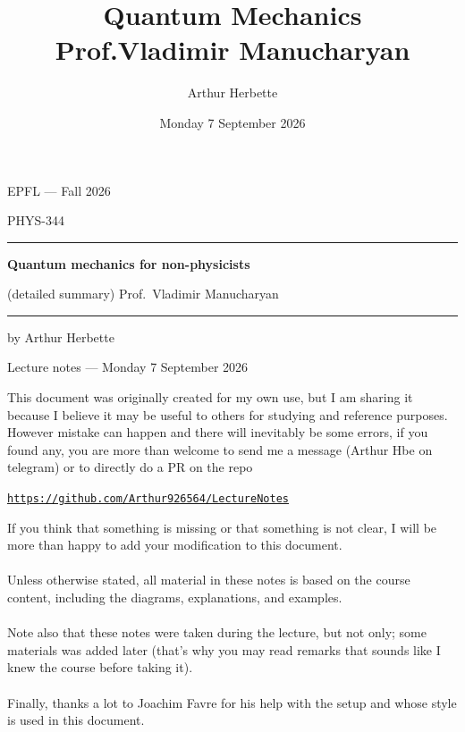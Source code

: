 \documentclass[a4paper]{book}
\title{Quantum Mechanics \\ Prof.Vladimir Manucharyan}
\author{Arthur Herbette}
\date{Monday 7 September 2026}
\begin{document}
\begin{titlepage}
    \centering
    \vspace*{2cm}
    
    {\large EPFL --- Fall 2026\par}
    \vspace{0.5cm}
    {\small PHYS-344\par}
    
    \vspace{2cm}
    \rule{\linewidth}{0.4pt}
    \vspace{0.4cm}
    
    {\huge\bfseries Quantum mechanics for non-physicists\par}
    \vspace{0.3cm}
    {(detailed summary) \large Prof.\ Vladimir Manucharyan\par}
    
    \vspace{0.4cm}
    \rule{\linewidth}{0.4pt}
    
    \vfill
    
    {by Arthur Herbette\par}
    \vspace{0.3cm}
    {\small Lecture notes --- Monday 7 September 2026\par}
    
    \vspace{2cm}
\end{titlepage}
This document was originally created for my own use, but I am sharing it because I believe it may be useful to others for studying and reference purposes. However mistake can happen and there will inevitably be some errors, if you found any, you are more than welcome to send me a message (Arthur Hbe on telegram) or to directly do a PR on the repo 
\begin{center}
	\texttt{\href{https://github.com/Arthur926564/LectureNotes}{https://github.com/Arthur926564/LectureNotes}}
\end{center}

If you think that something is missing or that something is not clear, I will be more than happy to add your modification to this document.\\
$ $\\
Unless otherwise stated, all material in these notes is based on the course content, including the diagrams, explanations, and examples.\\
$ $\\
Note also that these notes were taken during the lecture, but not only; some materials was added later (that's why you may read remarks that sounds like I knew the course before taking it).\\
$ $\\
Finally, thanks a lot to Joachim Favre for his help with the setup and whose style is used in this document.
\end{document}
